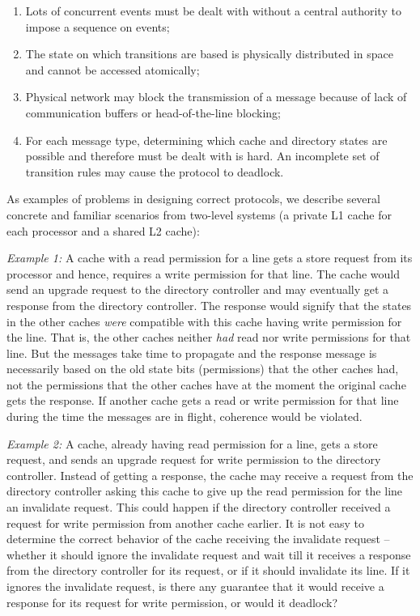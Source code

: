\begin{enumerate}

\item Lots of concurrent events must be dealt with without a central authority
to impose a sequence on events;

\item The state on which transitions are based is physically distributed in
space and cannot be accessed atomically;

\item Physical network may block the transmission of a message because of lack
of communication buffers or head-of-the-line blocking; 

\item For each message type, determining which cache and directory states are
possible and therefore must be dealt with is hard. An incomplete set of
transition rules may cause the protocol to deadlock.

\end{enumerate}

As examples of problems in designing correct protocols, we describe several
concrete and familiar scenarios from two-level systems (a private L1 cache for
each processor and a shared L2 cache):

\noindent \emph{Example 1:} A cache with a read permission for a line gets a
store request from its processor and hence, requires a write permission for
that line. The cache would send an upgrade request to the directory controller
and may eventually get a response from the directory controller. The response
would signify that the states in the other caches \emph{were} compatible with
this cache having write permission for the line. That is, the other caches
neither \emph{had} read nor write permissions for that line. But the messages
take time to propagate and the response message is necessarily based on the old
state bits (permissions) that the other caches had, not the permissions that
the other caches have at the moment the original cache gets the response. If
another cache gets a read or write permission for that line during the time the
messages are in flight, coherence would be violated.

\emph{Example 2:} A cache, already having read permission for a line, gets a
store request, and sends an upgrade request for write permission to the
directory controller. Instead of getting a response, the cache may receive a
request from the directory controller asking this cache to give up the read
permission for the line \ie an invalidate request. This could happen if the
directory controller received a request for write permission from another cache
earlier. It is not easy to determine the correct behavior of the cache
receiving the invalidate request -- whether it should ignore the invalidate
request and wait till it receives a response from the directory controller for
its request, or if it should invalidate its line. If it ignores the invalidate
request, is there any guarantee that it would receive a response for its
request for write permission, or would it deadlock?

